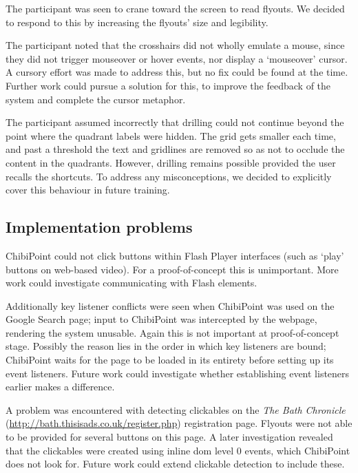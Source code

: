 \documentclass[11pt,openright,a4paper]{report}
\begin{document}
\FloatBarrier
The participant was seen to crane toward the screen to read flyouts. We decided to respond to this by increasing the flyouts' size and legibility.

The participant noted that the crosshairs did not wholly emulate a mouse, since they did not trigger mouseover or hover events, nor display a `mouseover' cursor. A cursory effort was made to address this, but no fix could be found at the time. Further work could pursue a solution for this, to improve the feedback of the system and complete the cursor metaphor.

The participant assumed incorrectly that drilling could not continue beyond the point where the quadrant labels were hidden. The grid gets smaller each time, and past a threshold the text and gridlines are removed so as not to occlude the content in the quadrants. However, drilling remains possible provided the user recalls the shortcuts. To address any misconceptions, we decided to explicitly cover this behaviour in future training.

\subsection{Implementation problems}
ChibiPoint could not click buttons within Flash Player interfaces (such as `play' buttons on web-based video). For a proof-of-concept this is unimportant. More work could investigate communicating with Flash elements.

Additionally key listener conflicts were seen when ChibiPoint was used on the Google Search page; input to ChibiPoint was intercepted by the webpage, rendering the system unusable. Again this is not important at proof-of-concept stage. Possibly the reason lies in the order in which key listeners are bound; ChibiPoint waits for the page to be loaded in its entirety before setting up its event listeners. Future work could investigate whether establishing event listeners earlier makes a difference.

A problem was encountered with detecting clickables on the \textit{The Bath Chronicle} (\url{http://bath.thisisads.co.uk/register.php}) registration page. Flyouts were not able to be provided for several buttons on this page. A later investigation revealed that the clickables were created using inline \gls{dom} level 0 events, which ChibiPoint does not look for. Future work could extend clickable detection to include these.
\end{document}
